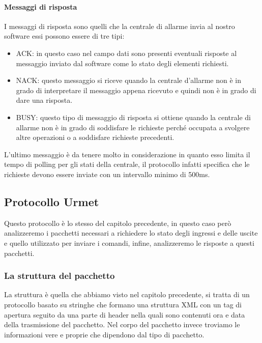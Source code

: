 \paragraph{Messaggi di risposta}
I messaggi di risposta sono quelli che la centrale di allarme invia al nostro software essi possono essere di tre tipi:
\begin{itemize}
	\item ACK: in questo caso nel campo dati sono presenti eventuali risposte al messaggio inviato dal software come lo stato degli elementi richiesti.
	\item NACK: questo messaggio si riceve quando la centrale d'allarme non è in grado di interpretare il messaggio appena ricevuto e quindi non è in grado di dare una risposta.
	\item BUSY: questo tipo di messaggio di risposta si ottiene quando la centrale di allarme non è in grado di soddisfare le richieste perché occupata a svolgere altre operazioni o a soddisfare richieste precedenti.
\end{itemize}
L'ultimo messaggio è da tenere molto in considerazione in quanto esso limita il tempo di polling per gli stati della centrale, il protocollo infatti specifica che le richieste devono essere inviate con un intervallo minimo di 500ms.
\subsection{Protocollo Urmet}
Questo protocollo è lo stesso del capitolo precedente, in questo caso però analizzeremo i pacchetti necessari a richiedere lo stato degli ingressi e delle uscite e quello utilizzato per inviare i comandi, infine, analizzeremo le risposte a questi pacchetti.
\subsubsection{La struttura del pacchetto}
La struttura è quella che abbiamo visto nel capitolo precedente, si tratta di un protocollo basato su stringhe che formano una struttura XML con un tag di apertura seguito da una parte di header nella quali sono contenuti ora e data della trasmissione del pacchetto. Nel corpo del pacchetto invece troviamo le informazioni vere e proprie che dipendono dal tipo di pacchetto.
